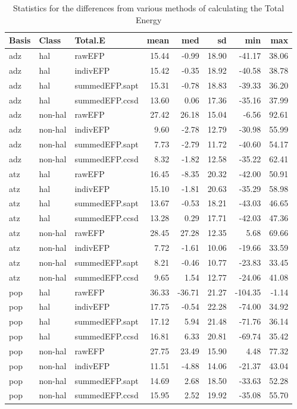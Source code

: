 \begin{table}[ht]
\centering
\footnotesize
\begin{tabular}{lllrrrrr}
  \hline
Basis & Class & Total.E & mean & med & sd & min & max \\ 
  \hline
adz & hal & rawEFP & 15.44 & -0.99 & 18.90 & -41.17 & 38.06 \\ 
  adz & hal & indivEFP & 15.42 & -0.35 & 18.92 & -40.58 & 38.78 \\ 
  adz & hal & summedEFP.sapt & 15.31 & -0.78 & 18.83 & -39.33 & 36.20 \\ 
  adz & hal & summedEFP.ccsd & 13.60 & 0.06 & 17.36 & -35.16 & 37.99 \\ 
  adz & non-hal & rawEFP & 27.42 & 26.18 & 15.04 & -6.56 & 92.61 \\ 
  adz & non-hal & indivEFP & 9.60 & -2.78 & 12.79 & -30.98 & 55.99 \\ 
  adz & non-hal & summedEFP.sapt & 7.73 & -2.79 & 11.72 & -40.60 & 54.17 \\ 
  adz & non-hal & summedEFP.ccsd & 8.32 & -1.82 & 12.58 & -35.22 & 62.41 \\ 
  atz & hal & rawEFP & 16.45 & -8.35 & 20.32 & -42.00 & 50.91 \\ 
  atz & hal & indivEFP & 15.10 & -1.81 & 20.63 & -35.29 & 58.98 \\ 
  atz & hal & summedEFP.sapt & 13.67 & -0.53 & 18.21 & -43.03 & 46.65 \\ 
  atz & hal & summedEFP.ccsd & 13.28 & 0.29 & 17.71 & -42.03 & 47.36 \\ 
  atz & non-hal & rawEFP & 28.45 & 27.28 & 12.35 & 5.68 & 69.66 \\ 
  atz & non-hal & indivEFP & 7.72 & -1.61 & 10.06 & -19.66 & 33.59 \\ 
  atz & non-hal & summedEFP.sapt & 8.21 & -0.46 & 10.77 & -23.83 & 33.45 \\ 
  atz & non-hal & summedEFP.ccsd & 9.65 & 1.54 & 12.77 & -24.06 & 41.08 \\ 
  pop & hal & rawEFP & 36.33 & -36.71 & 21.27 & -104.35 & -1.14 \\ 
  pop & hal & indivEFP & 17.75 & -0.54 & 22.28 & -74.00 & 34.92 \\ 
  pop & hal & summedEFP.sapt & 17.12 & 5.94 & 21.48 & -71.76 & 36.14 \\ 
  pop & hal & summedEFP.ccsd & 16.81 & 6.33 & 20.81 & -69.74 & 35.42 \\ 
  pop & non-hal & rawEFP & 27.75 & 23.49 & 15.90 & 4.48 & 77.32 \\ 
  pop & non-hal & indivEFP & 11.51 & -4.88 & 14.06 & -21.37 & 43.04 \\ 
  pop & non-hal & summedEFP.sapt & 14.69 & 2.68 & 18.50 & -33.63 & 52.28 \\ 
  pop & non-hal & summedEFP.ccsd & 15.95 & 2.52 & 19.92 & -35.08 & 55.70 \\ 
   \hline
\end{tabular}
    \caption{Statistics for the differences from various methods of calculating the Total Energy \label{tab:si.stats.recast}}
\end{table}

